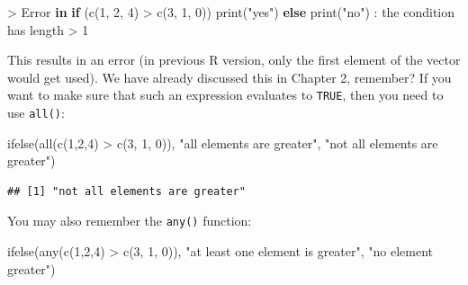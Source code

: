 \documentclass[
]{article}
\newenvironment{Shaded}{\begin{snugshade}}{\end{snugshade}}
\newcommand{\ControlFlowTok}[1]{\textcolor[rgb]{0.13,0.29,0.53}{\textbf{#1}}}
\newcommand{\DecValTok}[1]{\textcolor[rgb]{0.00,0.00,0.81}{#1}}
\newcommand{\FunctionTok}[1]{\textcolor[rgb]{0.00,0.00,0.00}{#1}}
\newcommand{\NormalTok}[1]{#1}
\newcommand{\SpecialCharTok}[1]{\textcolor[rgb]{0.00,0.00,0.00}{#1}}
\newcommand{\StringTok}[1]{\textcolor[rgb]{0.31,0.60,0.02}{#1}}
\begin{document}
\begin{Shaded}
\begin{Highlighting}[]
\SpecialCharTok{\textgreater{}}\NormalTok{ Error }\ControlFlowTok{in} \ControlFlowTok{if}\NormalTok{ (}\FunctionTok{c}\NormalTok{(}\DecValTok{1}\NormalTok{, }\DecValTok{2}\NormalTok{, }\DecValTok{4}\NormalTok{) }\SpecialCharTok{\textgreater{}} \FunctionTok{c}\NormalTok{(}\DecValTok{3}\NormalTok{, }\DecValTok{1}\NormalTok{, }\DecValTok{0}\NormalTok{)) }\FunctionTok{print}\NormalTok{(}\StringTok{"yes"}\NormalTok{) }\ControlFlowTok{else} \FunctionTok{print}\NormalTok{(}\StringTok{"no"}\NormalTok{) }\SpecialCharTok{:} 
\NormalTok{  the condition has length }\SpecialCharTok{\textgreater{}} \DecValTok{1}
\end{Highlighting}
\end{Shaded}

This results in an error (in previous R version, only the first element of the vector would get used).
We have already discussed this in Chapter 2, remember? If you want to make sure that such an expression
evaluates to \texttt{TRUE}, then you need to use \texttt{all()}:

\begin{Shaded}
\begin{Highlighting}[]
\FunctionTok{ifelse}\NormalTok{(}\FunctionTok{all}\NormalTok{(}\FunctionTok{c}\NormalTok{(}\DecValTok{1}\NormalTok{,}\DecValTok{2}\NormalTok{,}\DecValTok{4}\NormalTok{) }\SpecialCharTok{\textgreater{}} \FunctionTok{c}\NormalTok{(}\DecValTok{3}\NormalTok{, }\DecValTok{1}\NormalTok{, }\DecValTok{0}\NormalTok{)), }\StringTok{"all elements are greater"}\NormalTok{, }\StringTok{"not all elements are greater"}\NormalTok{)}
\end{Highlighting}
\end{Shaded}

\begin{verbatim}
## [1] "not all elements are greater"
\end{verbatim}

You may also remember the \texttt{any()} function:

\begin{Shaded}
\begin{Highlighting}[]
\FunctionTok{ifelse}\NormalTok{(}\FunctionTok{any}\NormalTok{(}\FunctionTok{c}\NormalTok{(}\DecValTok{1}\NormalTok{,}\DecValTok{2}\NormalTok{,}\DecValTok{4}\NormalTok{) }\SpecialCharTok{\textgreater{}} \FunctionTok{c}\NormalTok{(}\DecValTok{3}\NormalTok{, }\DecValTok{1}\NormalTok{, }\DecValTok{0}\NormalTok{)), }\StringTok{"at least one element is greater"}\NormalTok{, }\StringTok{"no element greater"}\NormalTok{)}
\end{Highlighting}
\end{Shaded}
\end{document}
